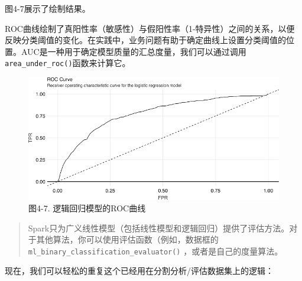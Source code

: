 \documentclass[
]{article}
\newenvironment{Shaded}{\begin{snugshade}}{\end{snugshade}}
\newcommand{\DecValTok}[1]{\textcolor[rgb]{0.00,0.00,0.81}{#1}}
\newcommand{\FloatTok}[1]{\textcolor[rgb]{0.00,0.00,0.81}{#1}}
\newcommand{\KeywordTok}[1]{\textcolor[rgb]{0.13,0.29,0.53}{\textbf{#1}}}
\newcommand{\NormalTok}[1]{#1}
\newcommand{\OperatorTok}[1]{\textcolor[rgb]{0.81,0.36,0.00}{\textbf{#1}}}
\begin{document}
图4-7展示了绘制结果。

ROC曲线绘制了真阳性率（敏感性）与假阳性率（1-特异性）之间的关系，以便反映分类阈值的变化。在实践中，业务问题有助于确定曲线上设置分类阈值的位置。AUC是一种用于确定模型质量的汇总度量，我们可以通过调用\texttt{area\_under\_roc()}函数来计算它。

\begin{figure}
\centering
\includegraphics{figures/4_7.png}
\caption{图4-7. 逻辑回归模型的ROC曲线}
\end{figure}

\begin{Shaded}
\end{Shaded}

\begin{quote}
Spark只为广义线性模型（包括线性模型和逻辑回归）提供了评估方法。对于其他算法，你可以使用评估函数（例如，数据框的\texttt{ml\_binary\_classification\_evaluator()}
，或者是自己的度量算法。
\end{quote}

现在，我们可以轻松的重复这个已经用在分割分析/评估数据集上的逻辑：
\end{document}
